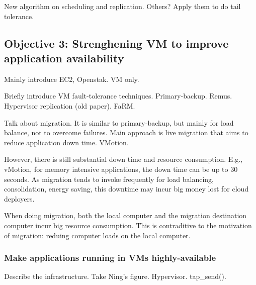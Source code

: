 
 New algorithm on scheduling and replication. Others? 
Apply them to do tail tolerance.

\vspace{-.15in}\subsection{Objective 3: Strenghening VM to improve application 
availability}\label{sec:vm}\vspace{-.075in}

Mainly introduce EC2, Openstak. VM only.

Briefly introduce VM fault-tolerance techniques. Primary-backup. Remus. 
Hypervisor replication (old paper). FaRM.

Talk about migration. It is similar to primary-backup, but mainly for load 
balance, not to overcome failures. Main approach is live migration that aims to 
reduce application down time. VMotion.

However, there is still substantial down time and resource consumption. E.g., 
vMotion, for memory intensive applications, the down time can be up to 30 
seconds. As migration tends to invoke frequently for load balancing, 
consolidation, energy saving, this downtime may incur big money lost for cloud 
deployers.

When doing migration, both the local computer and the migration destination 
computer incur big resource consumption. This is contraditive to the motivation 
of migration: reduing computer loads on the local computer.

\vspace{-.15in}\subsubsection{Make applications running in VMs 
highly-available} 
\label{sec:defense-arch}\vspace{-.075in}

Describe the infrastructure. Take Ning's figure. Hypervisor. tap\_send().

